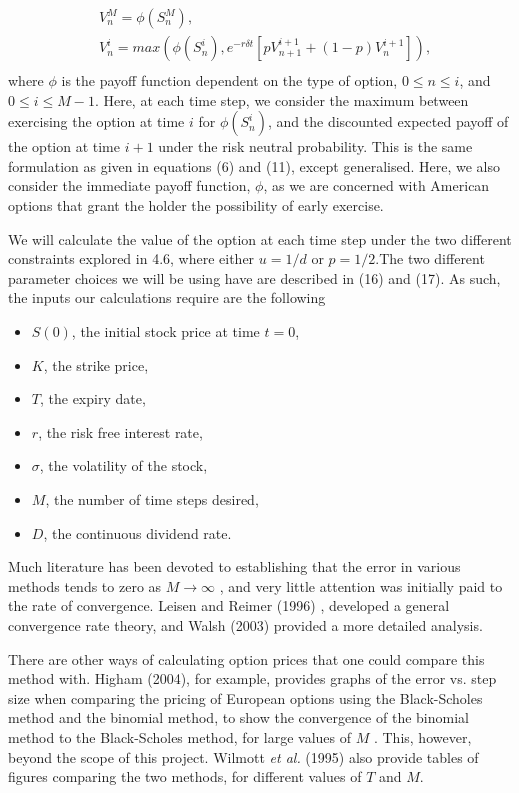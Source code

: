 \documentclass[letterpaper,12pt]{article}
\theoremstyle{plain}
\numberwithin{equation}{section}
\begin{document}
\begin{equation}
\begin{aligned}
	&V^M_n = \phi(S^M_n), \\
	&V^i_n = max(\phi(S^i_n), e^{-r\delta t}[pV^{i+1}_{n+1} + (1-p)V^{i+1}_{n}]), \\
\end{aligned}
\end{equation}
where $\phi$ is the payoff function dependent on the type of option, $0 \leq n \leq i$, and $0 \leq i \leq M-1$. Here, at each time step, we consider the maximum between exercising the option at time $i$ for $\phi(S^i_n)$, and the discounted expected payoff of the option at time $i+1$ under the risk neutral probability. This is the same formulation as given in equations (6) and (11), except generalised. Here, we also consider the immediate payoff function, $\phi$, as we are concerned with American options that grant the holder the possibility of early exercise.

We will calculate the value of the option at each time step under the two different constraints explored in 4.6, where either $u = 1/d$ or $p=1/2$.The two different parameter choices we will be using have are described in (16) and (17). As such, the inputs our calculations require are the following
\begin{itemize}
	\item $S(0)$, the initial stock price at time $t = 0$,
	\item $K$, the strike price,
	\item $T$, the expiry date,
	\item $r$, the risk free interest rate,
	\item $\sigma$, the volatility of the stock,
	\item $M$, the number of time steps desired,
	\item $D$, the continuous dividend rate.
\end{itemize} 

Much literature has been devoted to establishing that the error in various methods tends to zero as $M \rightarrow \infty$ \cite{FOV}, and very little attention was initially paid to the rate of convergence. Leisen and Reimer (1996) \cite{EIC}, developed a general convergence rate theory, and Walsh (2003) \cite{ROC} provided a more detailed analysis.

There are other ways of calculating option prices that one could compare this method with. Higham (2004), for example, provides graphs of the error vs. step size when comparing the pricing of European options using the Black-Scholes method and the binomial method, to show the convergence of the binomial method to the Black-Scholes method, for large values of $M$ \cite{FOV}. This, however, beyond the scope of this project. Wilmott {\em et al.} (1995) also provide tables of figures comparing the two methods, for different values of $T$ and $M$.
\end{document}
